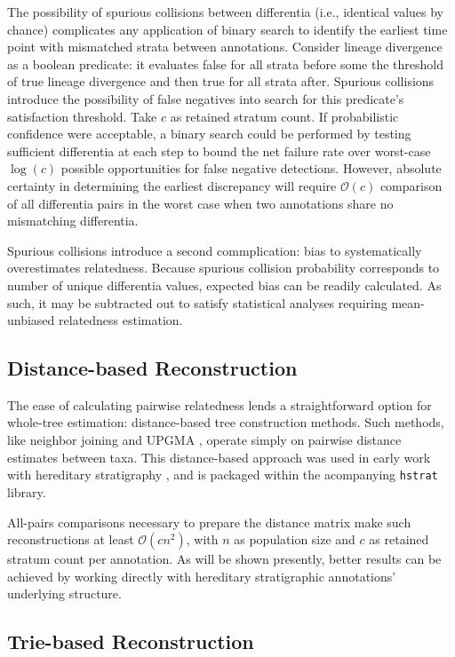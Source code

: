 The possibility of spurious collisions between differentia (i.e., identical values by chance) complicates any application of binary search to identify the earliest time point with mismatched strata between annotations.
Consider lineage divergence as a boolean predicate: it evaluates false for all strata before some the threshold of true lineage divergence and then true for all strata after.
Spurious collisions introduce the possibility of false negatives into search for this predicate's satisfaction threshold.
Take $c$ as retained stratum count.
If probabilistic confidence were acceptable, a binary search could be performed by testing sufficient differentia at each step to bound the net failure rate over worst-case $\log (c)$ possible opportunities for false negative detections.
However, absolute certainty in determining the earliest discrepancy will require $\mathcal{O}(c)$ comparison of all differentia pairs in the worst case when two annotations share no mismatching differentia.

Spurious collisions introduce a second commplication: bias to systematically overestimates relatedness.
Because spurious collision probability corresponds to number of unique differentia values, expected bias can be readily calculated.
As such, it may be subtracted out to satisfy statistical analyses requiring mean-unbiased relatedness estimation.

\subsection{Distance-based Reconstruction}
\label{sec:distance-based-reconstruction}

The ease of calculating pairwise relatedness lends a straightforward option for whole-tree estimation: distance-based tree construction methods.
Such methods, like neighbor joining and UPGMA \citep{peng2007distance}, operate simply on pairwise distance estimates between taxa.
This distance-based approach was used in early work with hereditary stratigraphy \citep{moreno2022hereditary}, and is packaged within the acompanying \texttt{hstrat} library.

All-pairs comparisons necessary to prepare the distance matrix make such reconstructions at least $\mathcal{O}(c n^2)$, with $n$ as population size and $c$ as retained stratum count per annotation.
As will be shown presently, better results can be achieved by working directly with hereditary stratigraphic annotations' underlying structure.

\subsection{Trie-based Reconstruction}
\label{sec:trie-based-reconstruction}

